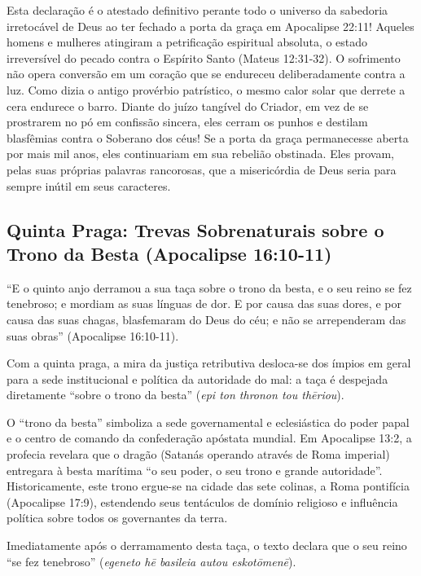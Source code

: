 \documentclass[11pt,a4paper,openany]{book}
\begin{document}
Esta declaração é o atestado definitivo perante todo o universo da sabedoria irretocável de Deus ao ter fechado a porta da graça em Apocalipse 22:11! Aqueles homens e mulheres atingiram a petrificação espiritual absoluta, o estado irreversível do pecado contra o Espírito Santo (Mateus 12:31-32). O sofrimento não opera conversão em um coração que se endureceu deliberadamente contra a luz. Como dizia o antigo provérbio patrístico, o mesmo calor solar que derrete a cera endurece o barro. Diante do juízo tangível do Criador, em vez de se prostrarem no pó em confissão sincera, eles cerram os punhos e destilam blasfêmias contra o Soberano dos céus! Se a porta da graça permanecesse aberta por mais mil anos, eles continuariam em sua rebelião obstinada. Eles provam, pelas suas próprias palavras rancorosas, que a misericórdia de Deus seria para sempre inútil em seus caracteres.



\subsection{Quinta Praga: Trevas Sobrenaturais sobre o Trono da Besta (Apocalipse 16:10-11)}


``E o quinto anjo derramou a sua taça sobre o trono da besta, e o seu reino se fez tenebroso; e mordiam as suas línguas de dor. E por causa das suas dores, e por causa das suas chagas, blasfemaram do Deus do céu; e não se arrependeram das suas obras'' (Apocalipse 16:10-11).

Com a quinta praga, a mira da justiça retributiva desloca-se dos ímpios em geral para a sede institucional e política da autoridade do mal: a taça é despejada diretamente ``sobre o trono da besta'' (\textit{epi ton thronon tou thēriou}).

O ``trono da besta'' simboliza a sede governamental e eclesiástica do poder papal e o centro de comando da confederação apóstata mundial. Em Apocalipse 13:2, a profecia revelara que o dragão (Satanás operando através de Roma imperial) entregara à besta marítima ``o seu poder, o seu trono e grande autoridade''. Historicamente, este trono ergue-se na cidade das sete colinas, a Roma pontifícia (Apocalipse 17:9), estendendo seus tentáculos de domínio religioso e influência política sobre todos os governantes da terra.

Imediatamente após o derramamento desta taça, o texto declara que o seu reino ``se fez tenebroso'' (\textit{egeneto hē basileia autou eskotōmenē}).
\end{document}
